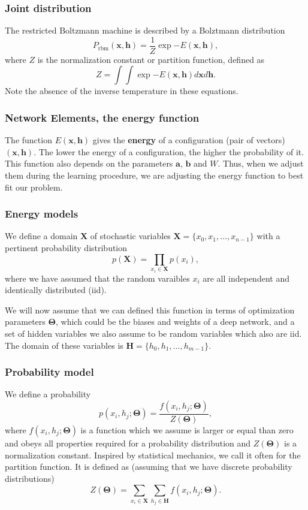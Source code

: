 \documentclass{beamer}
\begin{document}
\begin{frame}
\frametitle{Joint distribution}

The restricted Boltzmann machine is described by a Bolztmann distribution
\[
	P_{\mathrm{rbm}}(\bm{x},\bm{h}) = \frac{1}{Z} \exp{-E(\bm{x},\bm{h})},
\]
where $Z$ is the normalization constant or partition function, defined as 
\[
	Z = \int \int \exp{-E(\bm{x},\bm{h})} d\bm{x} d\bm{h}.
\]
Note the absence of the inverse temperature in these equations.
\end{frame}

\begin{frame}
\frametitle{Network Elements, the energy function}

The function $E(\bm{x},\bm{h})$ gives the \textbf{energy} of a
configuration (pair of vectors) $(\bm{x}, \bm{h})$. The lower
the energy of a configuration, the higher the probability of it. This
function also depends on the parameters $\bm{a}$, $\bm{b}$ and
$W$. Thus, when we adjust them during the learning procedure, we are
adjusting the energy function to best fit our problem.
\end{frame}

\begin{frame}
\frametitle{Energy models}

We define a domain $\bm{X}$ of stochastic variables $\bm{X}= \{x_0,x_1, \dots , x_{n-1}\}$ with a pertinent probability distribution
\[
p(\bm{X})=\prod_{x_i\in \bm{X}}p(x_i),
\]
where we have assumed that the random varaibles $x_i$ are all independent and identically distributed (iid).

We will now assume that we can defined this function in terms of optimization parameters $\bm{\Theta}$, which could be the biases and weights of a deep network, and a set of hidden variables we also assume to be random variables which also are iid. The domain of these variables is
$\bm{H}= \{h_0,h_1, \dots , h_{m-1}\}$.
\end{frame}

\begin{frame}
\frametitle{Probability model}

We define a probability
\[
p(x_i,h_j;\bm{\Theta}) = \frac{f(x_i,h_j;\bm{\Theta})}{Z(\bm{\Theta})},
\]
where $f(x_i,h_j;\bm{\Theta})$ is a function which we assume is larger or
equal than zero and obeys all properties required for a probability
distribution and $Z(\bm{\Theta})$ is a normalization constant. Inspired by
statistical mechanics, we call it often for the partition function.
It is defined as (assuming that we have discrete probability distributions)
\[
Z(\bm{\Theta})=\sum_{x_i\in \bm{X}}\sum_{h_j\in \bm{H}} f(x_i,h_j;\bm{\Theta}).
\]
\end{frame}
\end{document}
